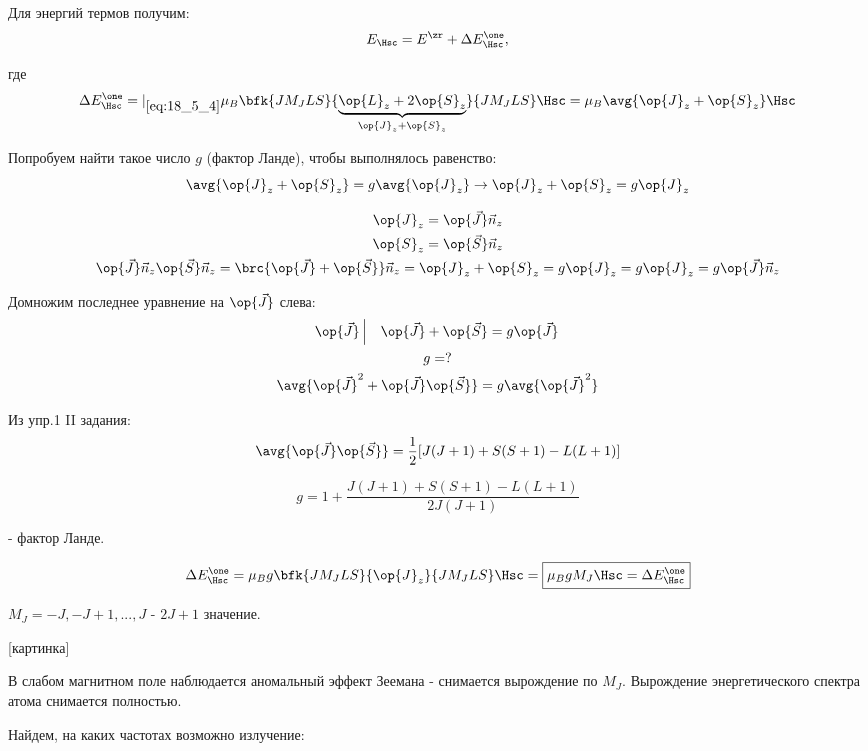 Для энергий термов получим:
$$
E_{\Hsc} = E^\zr + \Delta E_{\Hsc}^\one,
$$

где 
$$
\Delta E_{\Hsc}^\one =|_{\eqref{eq:18_5_4}} \mu_B \bfk{J M_J L S}{\underbrace{\op{L}_z + 2\op{S}_z}_{\op{J}_z + \op{S}_z}}{J M_J L S} \Hsc  = \mu_B \avg{\op{J}_z + \op{S}_z} \Hsc
$$

Попробуем найти такое число $g$ (фактор Ланде), чтобы выполнялось равенство:
$$
\avg{\op{J}_z + \op{S}_z} = g\avg{\op{J}_z} \to \op{J}_z + \op{S}_z = g\op{J}_z 
$$

\begin{gather*}
\op{J}_z = \op{\vec{J}} \vec{n}_z \\
\op{S}_z = \op{\vec{S}} \vec{n}_z \\
\op{\vec{J}} \vec{n}_z \op{\vec{S}} \vec{n}_z = \brc{\op{\vec{J}} + \op{\vec{S}}}\vec{n}_z = \op{J}_z + \op{S}_z = g \op{J}_z
 = g \op{J}_z = g \op{\vec{J}} \vec{n}_z
\end{gather*}

Домножим последнее уравнение на $\op{\vec{J}}$ слева:
\begin{gather*}
\op{\vec{J}} \left |~~~ \op{\vec{J}} + \op{\vec{S}} = g\op{\vec{J}} \right . \\
g = ? \\
\avg{\op{\vec{J}}^2 + \op{\vec{J}} \op{\vec{S}}} = g \avg{\op{\vec{J}}^2} \\
\end{gather*}

Из упр.1 II задания:
$$
\avg{\op{\vec{J}} \op{\vec{S}}} = \frac{1}{2}[J(J+1) + S(S+1) - L(L + 1)]
$$

\begin{equation}
\label{eq:18_6_3}
\boxed{g = 1 + \frac{J(J+1) + S(S + 1) - L(L + 1)}{2J(J+1)}}
\end{equation}

- фактор Ланде.

\begin{equation}
\label{eq:18_6_4}
\Delta E_{\Hsc}^\one = \mu_B g \bfk{J M_J L S}{\op{J}_z}{J M_J L S} \Hsc = \boxed{\mu_B g M_J \Hsc = \Delta E_{\Hsc}^\one}
\end{equation}

$M_J = -J, -J + 1, ..., J$ - $2J+1$ значение.

[картинка]

В слабом магнитном поле наблюдается аномальный эффект Зеемана - снимается вырождение по $M_J$. Вырождение энергетического спектра атома снимается полностью.

Найдем, на каких частотах возможно излучение:

